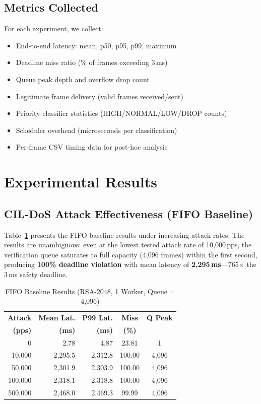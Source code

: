 \documentclass[journal]{IEEEtran}
\begin{document}
\subsection{Metrics Collected}
For each experiment, we collect:
\begin{itemize}[leftmargin=*]
    \item End-to-end latency: mean, p50, p95, p99, maximum
    \item Deadline miss ratio (\% of frames exceeding 3\,ms)
    \item Queue peak depth and overflow drop count
    \item Legitimate frame delivery (valid frames received/sent)
    \item Priority classifier statistics (HIGH/NORMAL/LOW/DROP counts)
    \item Scheduler overhead (microseconds per classification)
    \item Per-frame CSV timing data for post-hoc analysis
\end{itemize}

\section{Experimental Results}

\subsection{CIL-DoS Attack Effectiveness (FIFO Baseline)}
Table~\ref{tab:fifo_results} presents the FIFO baseline results under increasing attack rates. The results are unambiguous: even at the lowest tested attack rate of 10,000\,pps, the verification queue saturates to full capacity (4,096 frames) within the first second, producing \textbf{100\% deadline violation} with mean latency of \textbf{2,295\,ms}---765$\times$ the 3\,ms safety deadline.

\begin{table}[t]
\caption{FIFO Baseline Results (RSA-2048, 1 Worker, Queue = 4,096)}
\label{tab:fifo_results}
\centering
\small
\begin{tabular}{rrrcc}
\toprule
\textbf{Attack} & \textbf{Mean Lat.} & \textbf{P99 Lat.} & \textbf{Miss} & \textbf{Q Peak} \\
\textbf{(pps)} & \textbf{(ms)} & \textbf{(ms)} & \textbf{(\%)} & \\
\midrule
0       & 2.78    & 4.87     & 23.81  & 1 \\
10,000  & 2,295.5 & 2,312.8  & 100.00 & 4,096 \\
50,000  & 2,301.9 & 2,303.9  & 100.00 & 4,096 \\
100,000 & 2,318.1 & 2,318.8  & 100.00 & 4,096 \\
500,000 & 2,468.0 & 2,469.3  & 99.99  & 4,096 \\
\bottomrule
\end{tabular}
\end{table}
\end{document}
